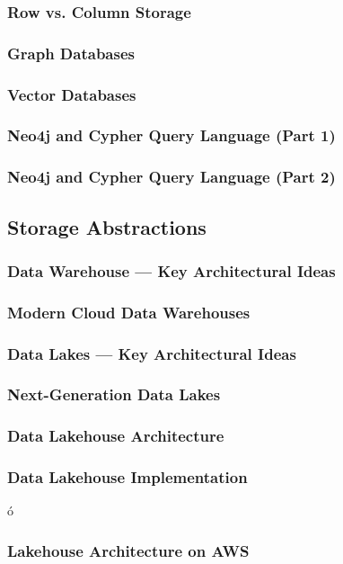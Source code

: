 \subsubsection{Row vs. Column Storage}
\subsubsection{Graph Databases}
\subsubsection{Vector Databases}
\subsubsection{Neo4j and Cypher Query Language (Part 1)}
\subsubsection{Neo4j and Cypher Query Language (Part 2)}

\subsection{Storage Abstractions}
\subsubsection{Data Warehouse — Key Architectural Ideas}
\subsubsection{Modern Cloud Data Warehouses}
\subsubsection{Data Lakes — Key Architectural Ideas}
\subsubsection{Next-Generation Data Lakes}
\subsubsection{Data Lakehouse Architecture}
\subsubsection{Data Lakehouse Implementation}ó
\subsubsection{Lakehouse Architecture on AWS}
